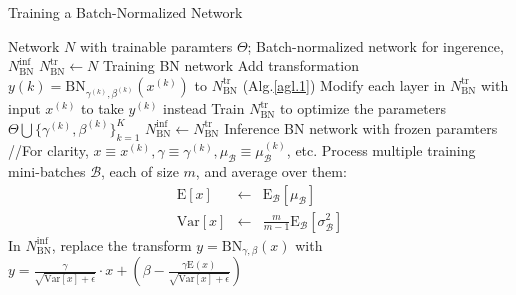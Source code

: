 \documentclass[12pt,a4paper]{article}
\begin{document}
\begin{algorithm}
\caption{Training a Batch-Normalized Network}
\begin{algorithmic}[1]
\Require  Network $N$ with trainable paramters $\Theta$;
\Ensure	Batch-normalized network for ingerence, $N_{\text{BN}}^{\text{inf}}$
\State $N_{\text{BN}}^{\text{tr}} \leftarrow N$ \Comment Training BN network
	\State Add transformation $y{(k)}=\text{BN}_{\gamma^{(k)}, \beta^{(k)}}(x^{(k)})$ to $N_{\text{BN}}^{\text{tr}}$ (Alg.\ref{agl.1})
	\State Modify each layer in $N_{\text{BN}}^{\text{tr}}$ with input $x^{(k)}$ to take $y^{(k)}$ instead
\EndFor	
\State Train $N_{\text{BN}}^{\text{tr}}$ to optimize the parameters $\Theta \bigcup \{\gamma^{(k)}, \beta^{(k)}\}_{k=1}^{K}$
\State $N_{\text{BN}}^{\text{inf}} \leftarrow N_{\text{BN}}^{\text{tr}}$ \Comment Inference BN network with frozen paramters
\State //For clarity, $x \equiv x^{(k)}, \gamma \equiv \gamma^{(k)}, \mu_{\mathcal{B}} \equiv \mu_{\mathcal{B}}^{(k)}$, etc.
\State Process multiple training mini-batches $\mathcal{B}$, each of size $m$, and average over them:
\begin{equation*}
\begin{array}{rcl}
\text{E}[x] & \leftarrow & \text{E}_{\mathcal{B}}[\mu_{\mathcal{B}}] \\
\text{Var}[x] & \leftarrow & \frac{m}{m-1}\text{E}_{\mathcal{B}}[\sigma_{\mathcal{B}}^{2}]
\end{array}
\end{equation*}
\State In $N_{\text{BN}}^{\text{inf}}$, replace the transform $y = \text{BN}_{\gamma, \beta}(x)$ with $y = \frac{\gamma}{\sqrt{\text{Var}[x] + \epsilon}} \cdot x + (\beta - \frac{\gamma\text{E}(x)}{\sqrt{\text{Var}[x] + \epsilon}})$
\EndFor
\end{algorithmic}
\end{algorithm}
%


\end{document}
